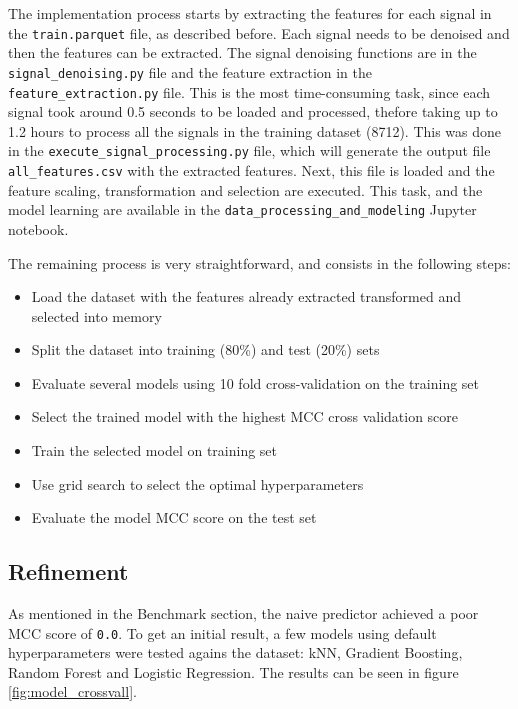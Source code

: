 \documentclass[11pt]{article}
\begin{document}
The implementation process starts by extracting the features for each
signal in the \texttt{train.parquet} file, as described before. Each
signal needs to be denoised and then the features can be extracted. The
signal denoising functions are in the \texttt{signal\_denoising.py} file
and the feature extraction in the \texttt{feature\_extraction.py} file.
This is the most time-consuming task, since each signal took around 0.5
seconds to be loaded and processed, thefore taking up to 1.2 hours to
process all the signals in the training dataset (8712). This was done in
the \texttt{execute\_signal\_processing.py} file, which will generate
the output file \texttt{all\_features.csv} with the extracted features.
Next, this file is loaded and the feature scaling, transformation and
selection are executed. This task, and the model learning are available
in the \texttt{data\_processing\_and\_modeling} Jupyter notebook.

The remaining process is very straightforward, and consists in the
following steps:

\begin{itemize}
	\item
	Load the dataset with the features already extracted
	transformed and selected into memory
	\item
	Split the dataset into training
	(80\%) and test (20\%) sets 
	\item
	Evaluate several models using 10 fold
	cross-validation on the training set
	\item
	Select the trained model with the
	highest MCC cross validation score
	\item 
	Train the selected model on
	training set
	\item 
	Use grid search to select the optimal
	hyperparameters
	\item 
	Evaluate the model MCC score on the test set
	
\end{itemize}

\hypertarget{refinement}{%
\subsection{Refinement}\label{refinement}}

As mentioned in the Benchmark section, the naive predictor achieved a
poor MCC score of \texttt{0.0}. To get an initial result, a few models
using default hyperparameters were tested agains the dataset: kNN,
Gradient Boosting, Random Forest and Logistic Regression. The results
can be seen in figure \ref{fig:model_crossvall}.
\end{document}
